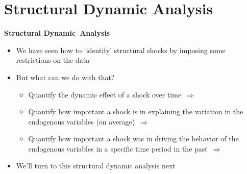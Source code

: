\documentclass[10pt,english,t,aspectratio=169,ignorenonframetext]{beamer}
\begin{document}

\section{Structural Dynamic Analysis}

\begin{frame}
\vspace{3cm}\color{title} 
\end{frame}


\begin{frame}
{\textbf{Structural Dynamic\ Analysis}}\bigskip

\begin{itemize}
\item We have seen how to `identify' structural shocks by imposing some
restrictions on the data\bigskip \medskip 

\item But what can we do with that?\medskip \pause

\begin{itemize}
\item Quantify the dynamic effect of a shock over time\ $\Rightarrow $\ {%
}\bigskip 

\item Quantify how important a shock is in explaining the variation in the
endogenous variables (on average)\ $\Rightarrow $\ {}%
\bigskip 

\item Quantify how important a shock was in driving the behavior of the
endogenous variables in a specific time period in the past\ $\Rightarrow $\ {%
}%
\bigskip \medskip 
\end{itemize}

\item We'll turn to this structural dynamic analysis next
\end{itemize}

\end{frame}
\end{document}

